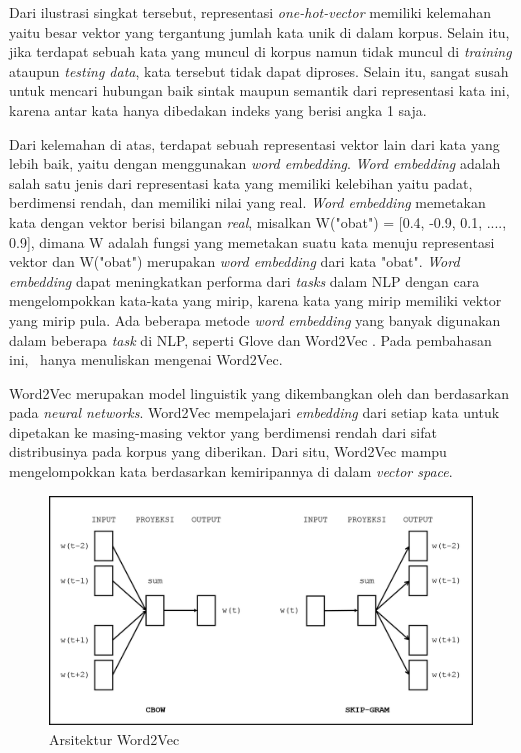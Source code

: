 Dari ilustrasi singkat tersebut, representasi \textit{one-hot-vector} memiliki kelemahan yaitu besar vektor yang tergantung jumlah kata unik di dalam korpus. Selain itu, jika terdapat sebuah kata yang muncul di korpus namun tidak muncul di \textit{training} ataupun \textit{testing data}, kata tersebut tidak dapat diproses. Selain itu, sangat susah untuk mencari hubungan baik sintak maupun semantik dari representasi kata ini, karena antar kata hanya dibedakan indeks yang berisi angka 1 saja.

Dari kelemahan di atas, terdapat sebuah representasi vektor lain dari kata yang lebih baik, yaitu dengan menggunakan \textit{word embedding}. \textit{Word embedding} adalah salah satu jenis dari representasi kata yang memiliki kelebihan yaitu padat, berdimensi rendah, dan memiliki nilai yang real. \textit{Word embedding} memetakan kata dengan vektor berisi bilangan \textit{real}, misalkan W("obat") = [0.4, -0.9, 0.1, ...., 0.9], dimana W adalah fungsi yang memetakan suatu kata menuju representasi vektor dan W("obat") merupakan \textit{word embedding} dari kata "obat". \textit{Word embedding} dapat meningkatkan performa dari \textit{tasks} dalam NLP dengan cara mengelompokkan kata-kata yang mirip, karena kata yang mirip memiliki vektor yang mirip pula. Ada beberapa metode \textit{word embedding} yang banyak digunakan dalam beberapa \textit{task} di NLP, seperti Glove \citep{pennington2014glove} dan Word2Vec \citep{mikolov2014word2vec}. Pada pembahasan ini, \saya~hanya menuliskan mengenai Word2Vec.

Word2Vec merupakan model linguistik yang dikembangkan oleh \cite{mikolov2014word2vec} dan berdasarkan pada \textit{neural networks}. Word2Vec mempelajari \textit{embedding} dari setiap kata untuk dipetakan ke masing-masing vektor yang berdimensi rendah dari sifat distribusinya pada korpus yang diberikan. Dari situ, Word2Vec mampu mengelompokkan kata berdasarkan kemiripannya di dalam \textit{vector space}.

\begin{figure}
	\centering
	\includegraphics[width=0.85\linewidth]{images/word2vec}
	\caption{Arsitektur Word2Vec}
	\label{fig:word2vec}
\end{figure}

